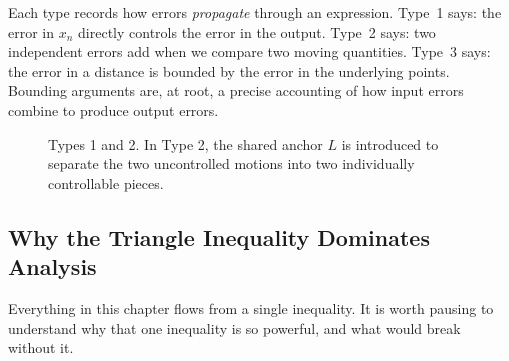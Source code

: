 \medskip

\begin{remark*}
Each type records how errors \emph{propagate} through an expression.
Type~1 says: the error in $x_n$ directly controls the error in the
output.
Type~2 says: two independent errors add when we compare two moving
quantities.
Type~3 says: the error in a distance is bounded by the error in the
underlying points.
Bounding arguments are, at root, a precise accounting of how input
errors combine to produce output errors.
\end{remark*}

\begin{figure}[h]
\centering
{}
\caption{Types 1 and 2. In Type 2, the shared anchor $L$ is introduced
to separate the two uncontrolled motions into two individually
controllable pieces.}
\end{figure}

\subsection{Why the Triangle Inequality Dominates Analysis}
\label{sec:why-ti-dominates}

Everything in this chapter flows from a single inequality.
It is worth pausing to understand why that one inequality is so powerful,
and what would break without it.

